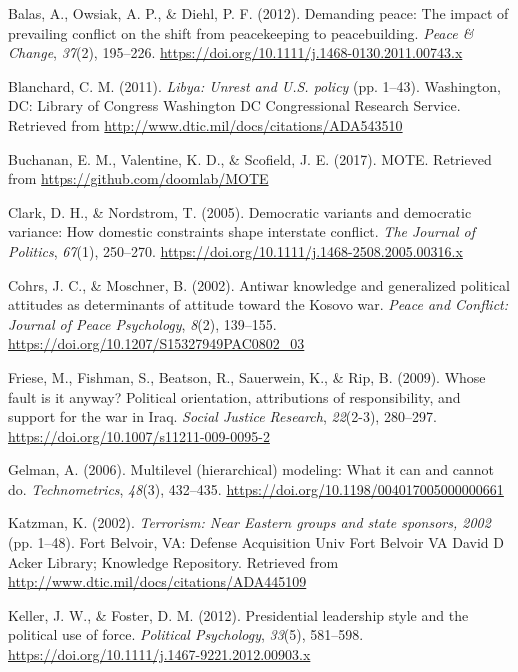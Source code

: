 \documentclass[english,,man]{apa6}
\begin{document}
\leavevmode\hypertarget{ref-Balas2012}{}%
Balas, A., Owsiak, A. P., \& Diehl, P. F. (2012). Demanding peace: The impact of prevailing conflict on the shift from peacekeeping to peacebuilding. \emph{Peace \& Change}, \emph{37}(2), 195--226. \url{https://doi.org/10.1111/j.1468-0130.2011.00743.x}

\leavevmode\hypertarget{ref-Blanchard2011}{}%
Blanchard, C. M. (2011). \emph{Libya: Unrest and U.S. policy} (pp. 1--43). Washington, DC: Library of Congress Washington DC Congressional Research Service. Retrieved from \url{http://www.dtic.mil/docs/citations/ADA543510}

\leavevmode\hypertarget{ref-Buchanan2017}{}%
Buchanan, E. M., Valentine, K. D., \& Scofield, J. E. (2017). MOTE. Retrieved from \url{https://github.com/doomlab/MOTE}

\leavevmode\hypertarget{ref-Clark2005}{}%
Clark, D. H., \& Nordstrom, T. (2005). Democratic variants and democratic variance: How domestic constraints shape interstate conflict. \emph{The Journal of Politics}, \emph{67}(1), 250--270. \url{https://doi.org/10.1111/j.1468-2508.2005.00316.x}

\leavevmode\hypertarget{ref-Cohrs2002}{}%
Cohrs, J. C., \& Moschner, B. (2002). Antiwar knowledge and generalized political attitudes as determinants of attitude toward the Kosovo war. \emph{Peace and Conflict: Journal of Peace Psychology}, \emph{8}(2), 139--155. \url{https://doi.org/10.1207/S15327949PAC0802_03}

\leavevmode\hypertarget{ref-Friese2009}{}%
Friese, M., Fishman, S., Beatson, R., Sauerwein, K., \& Rip, B. (2009). Whose fault is it anyway? Political orientation, attributions of responsibility, and support for the war in Iraq. \emph{Social Justice Research}, \emph{22}(2-3), 280--297. \url{https://doi.org/10.1007/s11211-009-0095-2}

\leavevmode\hypertarget{ref-Gelman2006}{}%
Gelman, A. (2006). Multilevel (hierarchical) modeling: What it can and cannot do. \emph{Technometrics}, \emph{48}(3), 432--435. \url{https://doi.org/10.1198/004017005000000661}

\leavevmode\hypertarget{ref-Katzman2002}{}%
Katzman, K. (2002). \emph{Terrorism: Near Eastern groups and state sponsors, 2002} (pp. 1--48). Fort Belvoir, VA: Defense Acquisition Univ Fort Belvoir VA David D Acker Library; Knowledge Repository. Retrieved from \url{http://www.dtic.mil/docs/citations/ADA445109}

\leavevmode\hypertarget{ref-Keller2012}{}%
Keller, J. W., \& Foster, D. M. (2012). Presidential leadership style and the political use of force. \emph{Political Psychology}, \emph{33}(5), 581--598. \url{https://doi.org/10.1111/j.1467-9221.2012.00903.x}
\end{document}
